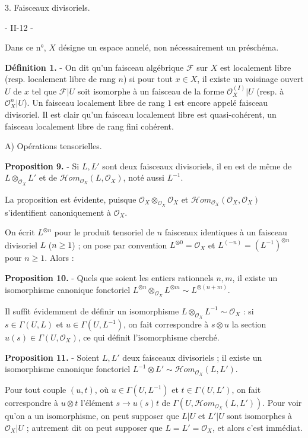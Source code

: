 3. Faisceaux divisoriels.

\newpage


- II-12 -

Dans ce n°, $X$ désigne un espace annelé, non nécessairement un préschéma.

\textbf{Définition 1.} - On dit qu'un faisceau algébrique $\mathcal{F}$ sur $X$ est localement libre (resp. localement libre de rang $n$) si pour tout $x \in X$, il existe un voisinage ouvert $U$ de $x$ tel que $\mathcal{F}|U$ soit isomorphe à un faisceau de la forme $\mathcal{O}_X^{(I)}|U$ (resp. à $\mathcal{O}_X^n|U$). Un faisceau localement libre de rang $1$ est encore appelé faisceau divisoriel. Il est clair qu'un faisceau localement libre est quasi-cohérent, un faisceau localement libre de rang fini cohérent.

A) Opérations tensorielles.

\textbf{Proposition 9.} - Si $L, L'$ sont deux faisceaux divisoriels, il en est de même de $L \otimes_{\mathcal{O}_X} L'$ et de $\mathcal{H}om_{\mathcal{O}_X}(L, \mathcal{O}_X)$, noté aussi $L^{-1}$.

La proposition est évidente, puisque $\mathcal{O}_X \otimes_{\mathcal{O}_X} \mathcal{O}_X$ et $\mathcal{H}om_{\mathcal{O}_X}(\mathcal{O}_X, \mathcal{O}_X)$ s'identifient canoniquement à $\mathcal{O}_X$.

On écrit $L^{\otimes n}$ pour le produit tensoriel de $n$ faisceaux identiques à un faisceau divisoriel $L$ ($n \ge 1$) ; on pose par convention $L^{\otimes 0} = \mathcal{O}_X$ et $L^{(-n)} = (L^{-1})^{\otimes n}$ pour $n \ge 1$. Alors :

\textbf{Proposition 10.} - Quels que soient les entiers rationnels $n, m$, il existe un isomorphisme canonique fonctoriel $L^{\otimes n} \otimes_{\mathcal{O}_X} L^{\otimes m} \sim L^{\otimes (n+m)}$.

Il suffit évidemment de définir un isomorphisme $L \otimes_{\mathcal{O}_X} L^{-1} \sim \mathcal{O}_X$ : si $s \in \Gamma(U, L)$ et $u \in \Gamma(U, L^{-1})$, on fait correspondre à $s \otimes u$ la section $u(s) \in \Gamma(U, \mathcal{O}_X)$, ce qui définit l'isomorphisme cherché.

\textbf{Proposition 11.} - Soient $L, L'$ deux faisceaux divisoriels ; il existe un isomorphisme canonique fonctoriel $L^{-1} \otimes L' \sim \mathcal{H}om_{\mathcal{O}_X}(L, L')$.

Pour tout couple $(u, t)$, où $u \in \Gamma(U, L^{-1})$ et $t \in \Gamma(U, L')$, on fait correspondre à $u \otimes t$ l'élément $s \to u(s)t$ de $\Gamma(U, \mathcal{H}om_{\mathcal{O}_X}(L, L'))$. Pour voir qu'on a un isomorphisme, on peut supposer que $L|U$ et $L'|U$ sont isomorphes à $\mathcal{O}_X|U$ ; autrement dit on peut supposer que $L = L' = \mathcal{O}_X$, et alors c'est immédiat.

